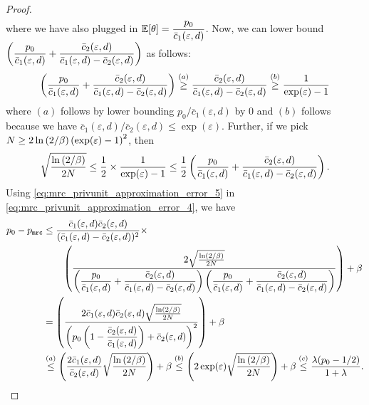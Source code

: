 \begin{proof}
\begin{align}
    \end{align}
    where we have also plugged in $\mathbb{E}[\theta] = \dfrac{p_0}{ \bar{c}_1(\varepsilon,d) }$. Now, we can lower bound $\left( \dfrac{p_0}{ \bar{c}_1(\varepsilon, d)}+\dfrac{ \bar{c}_2(\varepsilon, d)}{ \bar{c}_1(\varepsilon, d)- \bar{c}_2(\varepsilon, d)} \right)$ as follows:
    \begin{align}
        \left( \frac{p_0}{ \bar{c}_1(\varepsilon, d)}+\frac{ \bar{c}_2(\varepsilon, d)}{ \bar{c}_1(\varepsilon, d)- \bar{c}_2(\varepsilon, d)} \right) \stackrel{(a)}{\geq} \frac{ \bar{c}_2(\varepsilon, d)}{ \bar{c}_1(\varepsilon, d)- \bar{c}_2(\varepsilon, d)}
         \stackrel{(b)}{\geq} \frac{1}{\exp(\varepsilon)-1}
    \end{align}
    where $(a)$ follows by lower bounding $ p_0/\bar{c}_1(\varepsilon, d)$ by 0 and $(b)$ follows because we have $ \bar{c}_1(\varepsilon,d)/  \bar{c}_2(\varepsilon,d) \leq \exp(\varepsilon)$. Further, if we pick $N \geq 2 \ln \left( 2/\beta \right) \left(\exp(\varepsilon)-1\right)^2$, then
    \begin{align}
        \sqrt{\frac{\ln \left( 2/\beta \right)}{2N}} \leq \frac{1}{2} \times \frac{1}{\exp(\varepsilon)-1}\leq \frac{1}{2}   \left( \frac{p_0}{ \bar{c}_1(\varepsilon, d)}+\frac{ \bar{c}_2(\varepsilon, d)}{ \bar{c}_1(\varepsilon, d)- \bar{c}_2(\varepsilon, d)} \right). \label{eq:mrc_privunit_approximation_error_5}
    \end{align}
    Using \eqref{eq:mrc_privunit_approximation_error_5} in \eqref{eq:mrc_privunit_approximation_error_4}, we have 
    \begin{align}
p_0 - p_{\texttt{mrc}} & \leq  \frac{ \bar{c}_1(\varepsilon, d) \bar{c}_2(\varepsilon, d)}{( \bar{c}_1(\varepsilon, d)- \bar{c}_2(\varepsilon, d))^2} \times \\
& \qquad \lp \frac{2\sqrt{\frac{\ln \lp 2/\beta \rp}{2N}}}{ \lp \dfrac{p_0}{ \bar{c}_1(\varepsilon, d)}+\dfrac{ \bar{c}_2(\varepsilon, d)}{ \bar{c}_1(\varepsilon, d)- \bar{c}_2(\varepsilon, d)} \rp  \lp \dfrac{p_0}{ \bar{c}_1(\varepsilon, d)}+\dfrac{ \bar{c}_2(\varepsilon, d)}{ \bar{c}_1(\varepsilon, d)- \bar{c}_2(\varepsilon, d)} \rp} \rp + \beta \\
& = \lp \frac{2 \bar{c}_1(\varepsilon, d) \bar{c}_2(\varepsilon, d) \sqrt{\frac{\ln \lp 2/\beta \rp}{2N}}}{\lp  p_0 \lp1-\dfrac{ \bar{c}_2(\varepsilon, d)}{ \bar{c}_1(\varepsilon, d)}\rp + \bar{c}_2(\varepsilon, d) \rp^2} \rp + \beta\\
& \stackrel{(a)}{\leq}\lp \frac{2 \bar{c}_1(\varepsilon, d)}{ \bar{c}_2(\varepsilon, d)}  \sqrt{\frac{\ln \lp 2/\beta \rp}{2N}} \rp+ \beta \stackrel{(b)}{\leq}\lp 2 \exp(\varepsilon) \sqrt{\frac{\ln \lp 2/\beta \rp}{2N}} \rp+ \beta \stackrel{(c)}{\leq} \frac{\lambda(p_0 - 1/2)}{1+\lambda}. \label{eq:mrc_privunit_approximation_error_6}

\end{align}
\end{proof}
